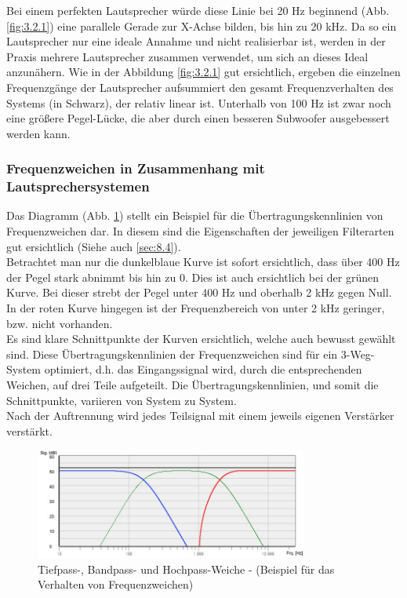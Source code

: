 Bei einem perfekten Lautsprecher würde diese Linie bei 20 Hz beginnend (Abb. \ref{fig:3.2.1}) eine parallele Gerade zur X-Achse bilden, bis hin zu 20 kHz.
Da so ein Lautsprecher nur eine ideale Annahme und nicht realisierbar ist, werden in der Praxis mehrere Lautsprecher zusammen verwendet, um sich an dieses Ideal anzunähern.
Wie in der Abbildung \ref{fig:3.2.1} gut ersichtlich, ergeben die einzelnen Frequenzgänge der Lautsprecher aufsummiert den gesamt Frequenzverhalten des Systems (in Schwarz), der relativ linear ist.
Unterhalb von 100 Hz ist zwar noch eine größere Pegel-Lücke, die aber durch einen besseren Subwoofer ausgebessert werden kann.

\subsubsection*{Frequenzweichen in Zusammenhang mit Lautsprechersystemen}
Das Diagramm (Abb. \ref{fig:3.2.2}) stellt ein Beispiel für die Übertragungskennlinien von Frequenzweichen dar.
In diesem sind die Eigenschaften der jeweiligen Filterarten gut ersichtlich (Siehe auch \ref{sec:8.4}).\\
Betrachtet man nur die dunkelblaue Kurve ist sofort ersichtlich, dass über 400 Hz der Pegel stark abnimmt bis hin zu 0.
Dies ist auch ersichtlich bei der grünen Kurve.
Bei dieser strebt der Pegel unter 400 Hz und oberhalb 2 kHz gegen Null.
In der roten Kurve hingegen ist der Frequenzbereich von unter 2 kHz geringer, bzw. nicht vorhanden.
\\
Es sind klare Schnittpunkte der Kurven ersichtlich, welche auch bewusst gewählt sind.
Diese Übertragungskennlinien der Frequenzweichen sind für ein 3-Weg-System optimiert, d.h. das Eingangssignal wird, durch die entsprechenden Weichen, auf drei Teile aufgeteilt.
Die Übertragungskennlinien, und somit die Schnittpunkte, variieren von System zu System.\\
Nach der Auftrennung wird jedes Teilsignal mit einem jeweils eigenen Verstärker verstärkt.
\begin{figure} [H]
	\centering
	\includegraphics[width=0.8\textwidth]{img/Grundlagen/Mehrweg-Lautsprechersysteme/Frequenzbereiche-Audio-Weiche-cut.jpg}
	\caption{Tiefpass-, Bandpass- und Hochpass-Weiche - (Beispiel für das Verhalten von Frequenzweichen)}
	\label{fig:3.2.2}
\end{figure}

